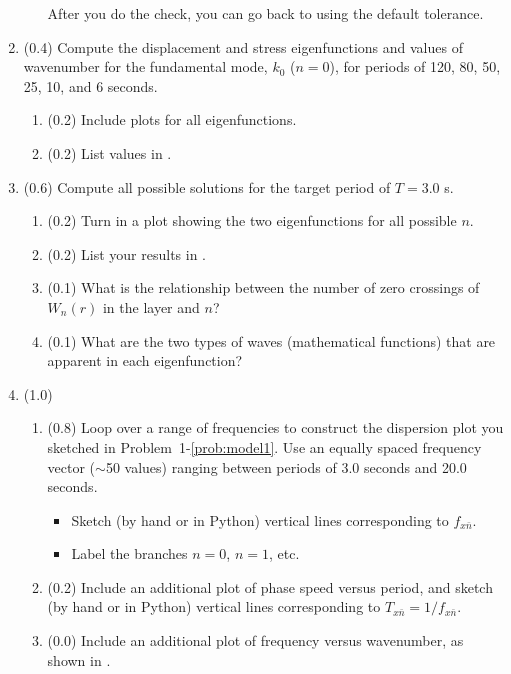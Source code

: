 \documentclass[11pt,titlepage,fleqn]{article}
\newcommand{\cutoff}[1]{{#1}_{x\bar{n}}}
\begin{document}
\begin{enumerate}
\begin{enumerate}
After you do the check, you can go back to using the default tolerance.
\end{enumerate}


\item (0.4) Compute the displacement and stress eigenfunctions and values of wavenumber for the fundamental mode, $k_0$ ($n=0$), for periods of 120, 80, 50, 25, 10, and 6 seconds.

\begin{enumerate}
\item (0.2) Include plots for all eigenfunctions.
\item (0.2) List values in .
\end{enumerate}


\item (0.6) Compute all possible solutions for the target period of $T = 3.0$ s.
%
\begin{enumerate}
\item (0.2) Turn in a plot showing the two eigenfunctions for all possible $n$.

\item (0.2) List your results in .

\item (0.1) What is the relationship between the number of zero crossings of $W_n(r)$ in the layer and $n$?
\item (0.1) What are the two types of waves (\ie mathematical functions) that are apparent in each eigenfunction?
\end{enumerate}


\item (1.0)
\begin{enumerate}
\item (0.8) Loop over a range of frequencies to construct the dispersion plot you sketched in Problem~1-\ref{prob:model1}. Use an equally spaced frequency vector ($\sim$50 values) ranging between periods of 3.0 seconds and 20.0 seconds.
%
\begin{itemize}
\item Sketch (by hand or in Python) vertical lines corresponding to $\cutoff{f}$.
\item Label the branches $n=0$, $n=1$, etc.
\end{itemize}

\item (0.2) Include an additional plot of phase speed versus period, and sketch (by hand or in Python) vertical lines corresponding to $\cutoff{T} = 1/\cutoff{f}$.

\item (0.0) Include an additional plot of frequency versus wavenumber, as shown in .
\end{enumerate}

\end{enumerate}
\end{document}

